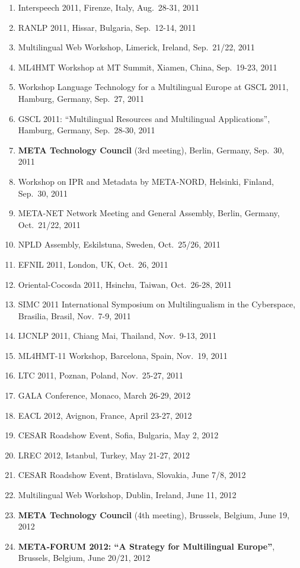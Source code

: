 \documentclass[10pt, plain]{../../metanetpaper}
\begin{document}
\begin{footnotesize}
\begin{enumerate}
\item Interspeech 2011, Firenze, Italy, Aug.~28-31, 2011
\item RANLP 2011, Hissar, Bulgaria, Sep.~12-14, 2011
\item Multilingual Web Workshop, Limerick, Ireland, Sep.~21/22, 2011
\item ML4HMT Workshop at MT Summit, Xiamen, China, Sep.~19-23, 2011
\item Workshop Language Technology for a Multilingual Europe at GSCL 2011, Hamburg, Germany, Sep.~27, 2011
\item GSCL 2011: ``Multilingual Resources and Multilingual Applications'', Hamburg, Germany, Sep.~28-30, 2011
\item \textbf{META Technology Council} (3rd meeting), Berlin, Germany, Sep.~30, 2011
\item Workshop on IPR and Metadata by META-NORD, Helsinki, Finland, Sep.~30, 2011
\item META-NET Network Meeting and General Assembly, Berlin, Germany, Oct.~21/22, 2011
\item NPLD Assembly, Eskilstuna, Sweden, Oct.~25/26, 2011
\item EFNIL 2011, London, UK, Oct.~26, 2011
\item Oriental-Cocosda 2011, Hsinchu, Taiwan, Oct.~26-28, 2011
\item SIMC 2011 International Symposium on Multilingualism in the Cyberspace, Brasilia, Brasil, Nov.~7-9, 2011
\item IJCNLP 2011, Chiang Mai, Thailand, Nov.~9-13, 2011
\item ML4HMT-11 Workshop, Barcelona, Spain, Nov.~19, 2011
\item LTC 2011, Poznan, Poland, Nov.~25-27, 2011
\item GALA Conference, Monaco, March 26-29, 2012
\item EACL 2012, Avignon, France, April 23-27, 2012
\item CESAR Roadshow Event, Sofia, Bulgaria, May 2, 2012
\item LREC 2012, Istanbul, Turkey, May 21-27, 2012
\item CESAR Roadshow Event, Bratislava, Slovakia, June 7/8, 2012
\item Multilingual Web Workshop, Dublin, Ireland, June 11, 2012
\item \textbf{META Technology Council} (4th meeting), Brussels, Belgium, June 19, 2012
\item \textbf{META-FORUM 2012: ``A Strategy for Multilingual Europe''}, Brussels, Belgium, June 20/21, 2012

\end{enumerate}
\end{footnotesize}
\end{document}
